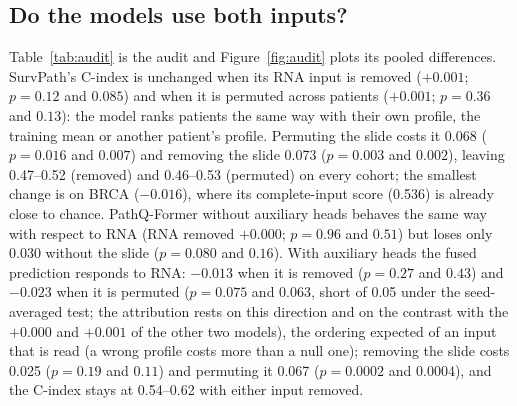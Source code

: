 \documentclass{article}
\newcommand{\pq}{PathQ-Former}
\newcommand{\cindex}{C-index}
\begin{document}
\subsection{Do the models use both inputs?}
\label{sec:audit}
Table~\ref{tab:audit} is the audit and Figure~\ref{fig:audit} plots its pooled differences. SurvPath's \cindex{} is unchanged when its RNA input is removed ($+0.001$; $p = 0.12$ and $0.085$) and when it is permuted across patients ($+0.001$; $p = 0.36$ and $0.13$): the model ranks patients the same way with their own profile, the training mean or another patient's profile. Permuting the slide costs it 0.068 ($p = 0.016$ and $0.007$) and removing the slide 0.073 ($p = 0.003$ and $0.002$), leaving 0.47--0.52 (removed) and 0.46--0.53 (permuted) on every cohort; the smallest change is on BRCA ($-0.016$), where its complete-input score (0.536) is already close to chance. \pq{} without auxiliary heads behaves the same way with respect to RNA (RNA removed $+0.000$; $p = 0.96$ and $0.51$) but loses only 0.030 without the slide ($p = 0.080$ and $0.16$). With auxiliary heads the fused prediction responds to RNA: $-0.013$ when it is removed ($p = 0.27$ and $0.43$) and $-0.023$ when it is permuted ($p = 0.075$ and $0.063$, short of 0.05 under the seed-averaged test; the attribution rests on this direction and on the contrast with the $+0.000$ and $+0.001$ of the other two models), the ordering expected of an input that is read (a wrong profile costs more than a null one); removing the slide costs 0.025 ($p = 0.19$ and $0.11$) and permuting it 0.067 ($p = 0.0002$ and $0.0004$), and the \cindex{} stays at 0.54--0.62 with either input removed.
\end{document}
